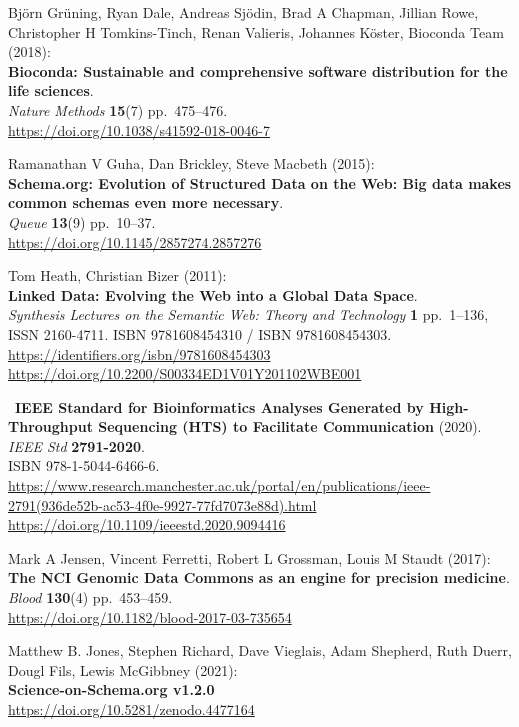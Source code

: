 \begin{thebibliography}{9}
Björn Grüning, Ryan Dale, Andreas Sjödin, Brad A Chapman,
Jillian Rowe, Christopher H Tomkins-Tinch, Renan Valieris, Johannes
Köster, Bioconda Team (2018):\\
\textbf{Bioconda: Sustainable and comprehensive software distribution
for the life sciences}.\\
\emph{Nature Methods} \textbf{15}(7) pp.~475--476.\\
\url{https://doi.org/10.1038/s41592-018-0046-7}

Ramanathan V Guha, Dan Brickley, Steve Macbeth (2015):\\
\textbf{Schema.org: Evolution of Structured Data on the Web: Big data
makes common schemas even more necessary}.\\
\emph{Queue} \textbf{13}(9) pp.~10--37.\\
\url{https://doi.org/10.1145/2857274.2857276}

Tom Heath, Christian Bizer (2011):\\
\textbf{Linked Data: Evolving the Web into a Global Data Space}.\\
\emph{Synthesis Lectures on the Semantic Web: Theory and Technology}
\textbf{1} pp.~1--136, ISSN 2160-4711. ISBN 9781608454310 / ISBN
9781608454303. \url{https://identifiers.org/isbn/9781608454303}\\
\url{https://doi.org/10.2200/S00334ED1V01Y201102WBE001}

~\textbf{IEEE Standard for Bioinformatics Analyses Generated by
High-Throughput Sequencing (HTS) to Facilitate Communication} (2020).\\
\emph{IEEE Std} \textbf{2791-2020}.\\
ISBN 978-1-5044-6466-6.\\
\url{https://www.research.manchester.ac.uk/portal/en/publications/ieee-2791(936de52b-ac53-4f0e-9927-77fd7073e88d).html}\\
\url{https://doi.org/10.1109/ieeestd.2020.9094416}

Mark A Jensen, Vincent Ferretti, Robert L Grossman, Louis M
Staudt (2017):\\
\textbf{The NCI Genomic Data Commons as an engine for precision
medicine}.\\
\emph{Blood} \textbf{130}(4) pp.~453--459.\\
\url{https://doi.org/10.1182/blood-2017-03-735654}

Matthew B. Jones, Stephen Richard, Dave Vieglais, Adam
Shepherd, Ruth Duerr, Dougl Fils, Lewis McGibbney (2021):\\
\textbf{Science-on-Schema.org v1.2.0}\\
\url{https://doi.org/10.5281/zenodo.4477164}


\end{thebibliography}
